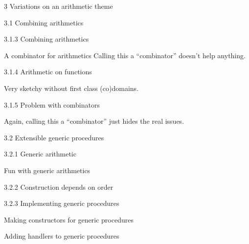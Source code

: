 \documentclass[12pt]{PalisadesLakesBook}
\begin{document}
\begin{plSection}{3 Variations on an arithmetic theme}
\begin{plSection}{3.1 Combining arithmetics}
\begin{plSection}{3.1.3 Combining arithmetics}
\begin{plSection}{A combinator for arithmetics}
Calling this a ``combinator'' doesn't help anything.

\end{plSection}%
\begin{plSection}{3.1.4 Arithmetic on functions}

Very sketchy without first class (co)domains.

\end{plSection}%
\begin{plSection}{3.1.5 Problem with combinators}

Again, calling this a ``combinator'' just hides the real issues.

\end{plSection}%
\end{plSection}%
\begin{plSection}{3.2 Extensible generic procedures}
\begin{plSection}{3.2.1 Generic arithmetic}
\begin{plSection}{Fun with generic arithmetics}
\end{plSection}%
\end{plSection}%
\begin{plSection}{3.2.2 Construction depends on order}
\end{plSection}%
\begin{plSection}{3.2.3 Implementing generic procedures}
\begin{plSection}{Making constructors for generic procedures}
\end{plSection}%
\begin{plSection}{Adding handlers to generic procedures}

\end{plSection}
\end{plSection}
\end{plSection}
\end{plSection}
\end{plSection}
\end{document}
